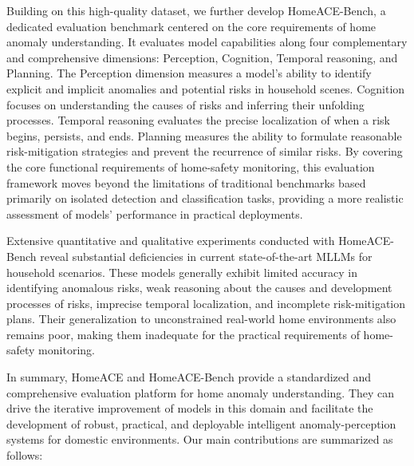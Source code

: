 \documentclass{article} %
\begin{document}
Building on this high-quality dataset, we further develop HomeACE-Bench, a dedicated evaluation benchmark centered on the core requirements of home anomaly understanding. It evaluates model capabilities along four complementary and comprehensive dimensions: Perception, Cognition, Temporal reasoning, and Planning. The Perception dimension measures a model's ability to identify explicit and implicit anomalies and potential risks in household scenes. Cognition focuses on understanding the causes of risks and inferring their unfolding processes. Temporal reasoning evaluates the precise localization of when a risk begins, persists, and ends. Planning measures the ability to formulate reasonable risk-mitigation strategies and prevent the recurrence of similar risks. By covering the core functional requirements of home-safety monitoring, this evaluation framework moves beyond the limitations of traditional benchmarks based primarily on isolated detection and classification tasks, providing a more realistic assessment of models' performance in practical deployments.

Extensive quantitative and qualitative experiments conducted with HomeACE-Bench reveal substantial deficiencies in current state-of-the-art MLLMs for household scenarios. These models generally exhibit limited accuracy in identifying anomalous risks, weak reasoning about the causes and development processes of risks, imprecise temporal localization, and incomplete risk-mitigation plans. Their generalization to unconstrained real-world home environments also remains poor, making them inadequate for the practical requirements of home-safety monitoring.

In summary, HomeACE and HomeACE-Bench provide a standardized and comprehensive evaluation platform for home anomaly understanding. They can drive the iterative improvement of models in this domain and facilitate the development of robust, practical, and deployable intelligent anomaly-perception systems for domestic environments. Our main contributions are summarized as follows:
\end{document}
